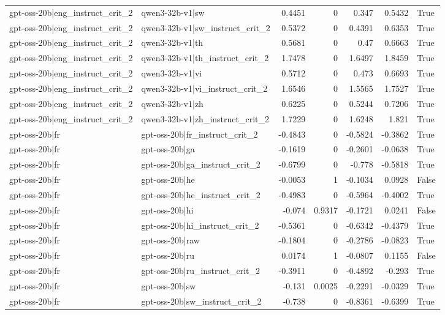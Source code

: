\begin{table}
\begin{tabular}{l l r r r r l}
gpt-oss-20b|eng_instruct_crit_2 & qwen3-32b-v1|sw & 0.4451 & 0 & 0.347 & 0.5432 & True \\
gpt-oss-20b|eng_instruct_crit_2 & qwen3-32b-v1|sw_instruct_crit_2 & 0.5372 & 0 & 0.4391 & 0.6353 & True \\
gpt-oss-20b|eng_instruct_crit_2 & qwen3-32b-v1|th & 0.5681 & 0 & 0.47 & 0.6663 & True \\
gpt-oss-20b|eng_instruct_crit_2 & qwen3-32b-v1|th_instruct_crit_2 & 1.7478 & 0 & 1.6497 & 1.8459 & True \\
gpt-oss-20b|eng_instruct_crit_2 & qwen3-32b-v1|vi & 0.5712 & 0 & 0.473 & 0.6693 & True \\
gpt-oss-20b|eng_instruct_crit_2 & qwen3-32b-v1|vi_instruct_crit_2 & 1.6546 & 0 & 1.5565 & 1.7527 & True \\
gpt-oss-20b|eng_instruct_crit_2 & qwen3-32b-v1|zh & 0.6225 & 0 & 0.5244 & 0.7206 & True \\
gpt-oss-20b|eng_instruct_crit_2 & qwen3-32b-v1|zh_instruct_crit_2 & 1.7229 & 0 & 1.6248 & 1.821 & True \\
gpt-oss-20b|fr & gpt-oss-20b|fr_instruct_crit_2 & -0.4843 & 0 & -0.5824 & -0.3862 & True \\
gpt-oss-20b|fr & gpt-oss-20b|ga & -0.1619 & 0 & -0.2601 & -0.0638 & True \\
gpt-oss-20b|fr & gpt-oss-20b|ga_instruct_crit_2 & -0.6799 & 0 & -0.778 & -0.5818 & True \\
gpt-oss-20b|fr & gpt-oss-20b|he & -0.0053 & 1 & -0.1034 & 0.0928 & False \\
gpt-oss-20b|fr & gpt-oss-20b|he_instruct_crit_2 & -0.4983 & 0 & -0.5964 & -0.4002 & True \\
gpt-oss-20b|fr & gpt-oss-20b|hi & -0.074 & 0.9317 & -0.1721 & 0.0241 & False \\
gpt-oss-20b|fr & gpt-oss-20b|hi_instruct_crit_2 & -0.5361 & 0 & -0.6342 & -0.4379 & True \\
gpt-oss-20b|fr & gpt-oss-20b|raw & -0.1804 & 0 & -0.2786 & -0.0823 & True \\
gpt-oss-20b|fr & gpt-oss-20b|ru & 0.0174 & 1 & -0.0807 & 0.1155 & False \\
gpt-oss-20b|fr & gpt-oss-20b|ru_instruct_crit_2 & -0.3911 & 0 & -0.4892 & -0.293 & True \\
gpt-oss-20b|fr & gpt-oss-20b|sw & -0.131 & 0.0025 & -0.2291 & -0.0329 & True \\
gpt-oss-20b|fr & gpt-oss-20b|sw_instruct_crit_2 & -0.738 & 0 & -0.8361 & -0.6399 & True \\

\end{tabular}
\end{table}
